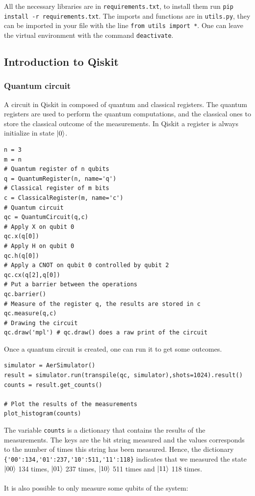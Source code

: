 \documentclass{article}
\begin{document}
All the necessary libraries are in \verb|requirements.txt|, to install them run \verb|pip install -r requirements.txt|. The imports and functions are in \verb|utils.py|, they can be imported in your file with the line \verb|from utils import *|. One can leave the virtual environment with the command \verb|deactivate|.

\subsection{Introduction to Qiskit}

\subsubsection{Quantum circuit}

A circuit in Qiskit in composed of quantum and classical registers. The quantum registers are used to perform the quantum computations, and the classical ones to store the classical outcome of the measurements. In Qiskit a register is always initialize in state $\ket{0}$.

\begin{verbatim}
n = 3
m = n
# Quantum register of n qubits
q = QuantumRegister(n, name='q')
# Classical register of m bits
c = ClassicalRegister(m, name='c')
# Quantum circuit
qc = QuantumCircuit(q,c)
# Apply X on qubit 0
qc.x(q[0])
# Apply H on qubit 0
qc.h(q[0])
# Apply a CNOT on qubit 0 controlled by qubit 2
qc.cx(q[2],q[0])
# Put a barrier between the operations
qc.barrier()
# Measure of the register q, the results are stored in c
qc.measure(q,c)
# Drawing the circuit
qc.draw('mpl') # qc.draw() does a raw print of the circuit
\end{verbatim}
Once a quantum circuit is created, one can run it to get some outcomes.

\begin{verbatim}
simulator = AerSimulator()
result = simulator.run(transpile(qc, simulator),shots=1024).result()
counts = result.get_counts()

# Plot the results of the measurements
plot_histogram(counts)
\end{verbatim}
The variable \verb|counts| is a dictionary that contains the results of the measurements. The keys are the bit string measured and the values corresponds to the number of times this string has been measured. Hence, the dictionary \verb|{'00':134,'01':237,'10':511,'11':118}| indicates that we measured the state $\ket{00}$ 134 times, $\ket{01}$ 237 times, $\ket{10}$ 511 times and $\ket{11}$ 118 times. \\\\ It is also possible to only measure some qubits of the system:
\end{document}
